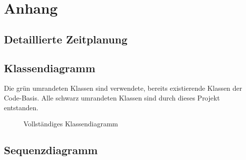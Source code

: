 \section{Anhang}

\subsection{Detaillierte Zeitplanung}
\label{app:Zeitplanung}

%
%

\subsection{Klassendiagramm}
\label{app:Klassendiagramm}

Die grün umrandeten Klassen sind verwendete, bereits existierende Klassen der Code-Basis.
Alle schwarz umrandeten Klassen sind durch dieses Projekt entstanden.

\begin{figure}[htb]
\centering
{}
\caption{Vollständiges Klassendiagramm}
\end{figure}

\subsection{Sequenzdiagramm}
\label{app:Sequenzdiagramm}

\clearpage



\clearpage
%


